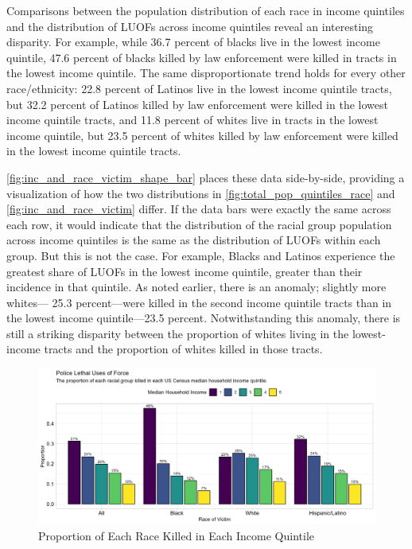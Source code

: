\documentclass[12pt]{article}
\begin{document}
Comparisons between the population distribution of each race in income quintiles and the distribution of LUOFs across income quintiles reveal an interesting disparity. For example, while 36.7 percent of blacks live in the lowest income quintile, 47.6 percent of blacks killed by law enforcement were killed in tracts in the lowest income quintile. The same disproportionate trend holds for every other race/ethnicity: 22.8 percent of Latinos live in the lowest income quintile tracts, but 32.2 percent of Latinos killed by law enforcement were killed in the lowest income quintile tracts, and 11.8 percent of whites live in tracts in the lowest income quintile, but 23.5 percent of whites killed by law enforcement were killed in the lowest income quintile tracts.

\autoref{fig:inc_and_race_victim_shape_bar} places these data side-by-side, providing a visualization of how the two
distributions in \autoref{fig:total_pop_quintiles_race} and \autoref{fig:inc_and_race_victim} differ. If the data bars were exactly the same across each row, it would indicate that the distribution of the racial group population across income quintiles is the same as the distribution of LUOFs within each group. But this is not the case. For example, Blacks and Latinos experience the greatest share of LUOFs in the lowest income quintile, greater than their incidence in that quintile. As noted earlier, there is an anomaly; slightly more whites— 25.3 percent—were killed in the second income quintile tracts than in the lowest income quintile—23.5 percent. Notwithstanding this anomaly, there is still a striking disparity between the proportion of whites living in the lowest-income tracts and the proportion of whites killed in those tracts.
\begin{figure}[H]
  \centering
  \includegraphics[width=\linewidth]{images/inc_and_race_victim}
  \captionsetup{justification=centering, singlelinecheck=false, margin=2cm}
  \caption{Proportion of Each Race Killed in Each Income Quintile}
  \label{fig:inc_and_race_victim}
\end{figure}
\end{document}
